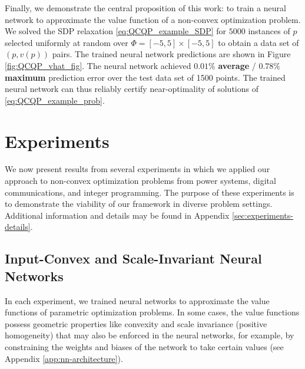 \documentclass[10pt]{article} %
\theoremstyle{plain}
\theoremstyle{definition}
\theoremstyle{remark}
\begin{document}
Finally, we demonstrate the central proposition of this work: to train a neural network to approximate the value function of a non-convex optimization problem. We solved the SDP relaxation \eqref{eq:QCQP_example_SDP} for $5000$ instances of $p$ selected uniformly at random over $\Phi = [-5, 5] \times[-5,5]$ to obtain a data set of $(p, v(p))$ pairs.
The trained neural network predictions are shown in Figure \ref{fig:QCQP_vhat_fig}. The neural network achieved $\mathbf{0.01\%}$ \textbf{average} / $\mathbf{0.78\%}$ \textbf{maximum} prediction error over the test data set of 1500 points. The trained neural network can thus reliably certify near-optimality of solutions of \eqref{eq:QCQP_example_prob}.

\section{Experiments} \label{sec:experiments}

We now present results from several experiments in which we applied our approach to non-convex optimization problems from power systems, digital communications, and integer programming.
The purpose of these experiments is to demonstrate the viability of our framework in diverse problem settings.
Additional information and details may be found in Appendix \ref{sec:experiments-details}.

\subsection{Input-Convex and Scale-Invariant Neural Networks}

In each experiment, we trained neural networks to approximate the value functions of parametric optimization problems. In some cases, the value functions possess geometric properties like convexity and scale invariance (positive homogeneity) that may also be enforced in the neural networks, for example, by constraining the weights and biases of the network to take certain values (see Appendix \ref{app:nn-architecture}). 
\end{document}

